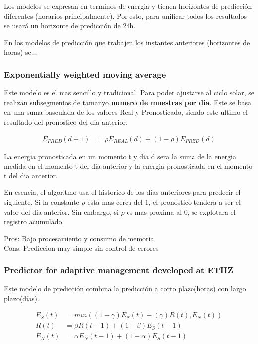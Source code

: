 Los modelos se expresan en terminos de energia y tienen horizontes de predicción diferentes (horarios principalmente). Por esto, para unificar todos los resultados se usará un horizonte de predicción de 24h.

En los modelos de predicción que trabajen los instantes anteriores (horizontes de horas) se...


\subsubsection{ Exponentially weighted moving average} 
\label{ssub:subsubsection_name}

Este modelo es el mas sencillo y tradicional. Para poder ajustarse al ciclo solar, se realizan subsegmentos de tamanyo \textbf{numero de muestras por dia}. 
Este se basa en una suma basculada de los valores Real y Pronosticado, siendo este ultimo el resultado del pronostico del dia anterior.

\begin{align}
	E_{PRED}(d+1) &= \rho E_{REAL}(d) + (1-\rho) E_{PRED}(d)
\end{align}

La energia pronosticada en un momento t y dia d sera la suma de la energia medida en el momento t del dia anterior y la energia pronosticada en el momento t del dia anterior.

En esencia, el algoritmo usa el historico de los dias anteriores para predecir el siguiente. Si la constante $\rho$ esta mas cerca del 1, el pronostico tendera a ser el valor del dia anterior. Sin embargo, si $\rho$ es mas proxima al 0, se explotara el registro acumulado. 

Pros: Bajo procesamiento y consumo de memoria\\
Cons: Prediccion muy simple sin control de errores


\subsubsection{ Predictor for adaptive management developed at ETHZ} 
\label{ssub:subsubsection_name}

Este modelo de predicción combina la predicción a corto plazo(horas) con largo plazo(días).

\begin{align}
	E_S(t) &= min( (1-\gamma) E_N(t) + (\gamma) R(t), E_N(t) ) \\
	R(t) &= \beta R(t-1) + (1-\beta) E_S(t-1) \\
	E_N(t) &= \alpha E_N(t-1) + (1-\alpha) E_S(t-1)
\end{align}

